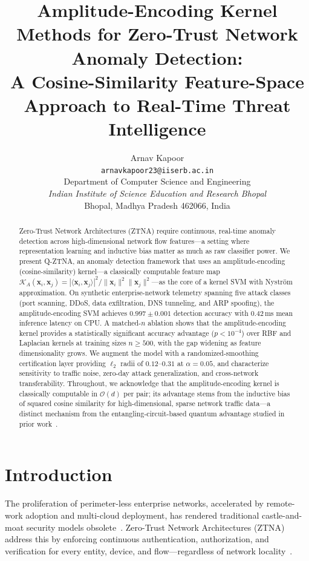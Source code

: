 \documentclass[twocolumn,a4paper,11pt]{article}
\title{Amplitude-Encoding Kernel Methods for Zero-Trust Network Anomaly Detection: \\ A Cosine-Similarity Feature-Space Approach to Real-Time Threat Intelligence}
\author{
  Arnav Kapoor \\
  \texttt{arnavkapoor23@iiserb.ac.in} \\
  Department of Computer Science and Engineering \\
  \textit{Indian Institute of Science Education and Research Bhopal} \\
  Bhopal, Madhya Pradesh 462066, India
}
\begin{document}
\raggedbottom

\maketitle

\begin{abstract}
Zero-Trust Network Architectures (ZTNA) require continuous, real-time anomaly
detection across high-dimensional network flow features---a setting where
representation learning and inductive bias matter as much as raw classifier power.
We present Q-ZTNA, an anomaly detection framework that uses an
amplitude-encoding (cosine-similarity) kernel---a classically computable feature map
$\mathcal{K}_A(\mathbf{x}_i, \mathbf{x}_j) = |\langle\mathbf{x}_i, \mathbf{x}_j
\rangle|^2 / \|\mathbf{x}_i\|^2 \|\mathbf{x}_j\|^2$---as the core of a kernel SVM
with Nystr\"om approximation. On synthetic enterprise-network telemetry spanning
five attack classes (port scanning, DDoS, data exfiltration, DNS tunneling, and ARP
spoofing), the amplitude-encoding SVM achieves $0.997 \pm 0.001$ detection accuracy
with 0.42\,ms mean inference latency on CPU. A matched-$n$ ablation shows that the
amplitude-encoding kernel provides a statistically significant accuracy advantage
($p < 10^{-4}$) over RBF and Laplacian kernels at training sizes $n \geq 500$, with
the gap widening as feature dimensionality grows. We augment the model with a
randomized-smoothing certification layer providing $\ell_2$ radii of
$0.12$--$0.31$ at $\alpha = 0.05$, and characterize sensitivity to traffic noise,
zero-day attack generalization, and cross-network transferability. Throughout, we
acknowledge that the amplitude-encoding kernel is classically computable in
$\mathcal{O}(d)$ per pair; its advantage stems from the inductive bias of squared
cosine similarity for high-dimensional, sparse network traffic data---a distinct
mechanism from the entangling-circuit-based quantum advantage studied in prior
work~\cite{havlicek2019supervised,huang2021power}.
\end{abstract}

\section{Introduction}
\label{sec:intro}

The proliferation of perimeter-less enterprise networks, accelerated by remote-work
adoption and multi-cloud deployment, has rendered traditional castle-and-moat security
models obsolete~\cite{rose2020zero,kindervag2010zero}. Zero-Trust Network
Architectures (ZTNA) address this by enforcing continuous authentication,
authorization, and verification for every entity, device, and flow---regardless of
network locality~\cite{nist800207,gilman2019zero}.
\end{document}

